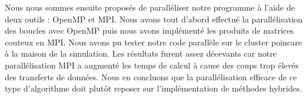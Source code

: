 \documentclass[11pt,a4paper]{article}
\begin{document}
	Nous nous sommes ensuite proposés de paralléliser notre programme à l'aide de deux outils : OpenMP et MPI. Nous avons tout d'abord effectué la parallélisation des boucles avec OpenMP puis nous avons implémenté les produits de matrices couteux en MPI. Nous avons pu tester notre code parallèle sur le cluster poincare à la maison de la simulation. Les résultats furent assez décevants car notre parallélisation MPI a augmenté les temps de calcul à cause des coups trop élevés des transferts de données. Nous en concluons que la parallélisation efficace de ce type d'algorithme doit plutôt reposer sur l'implémentation de méthodes hybrides.
\end{document}
